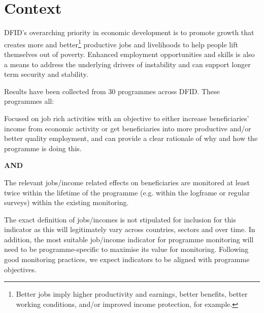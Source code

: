 \section{Context}

DFID's overarching priority in economic development is to promote growth that creates more and better\footnote{Better jobs imply higher productivity and earnings, better benefits, better working conditions, and/or improved income protection, for example.} productive jobs and livelihoods to help people lift themselves out of poverty. %
Enhanced employment opportunities and skills is also a means to address the underlying drivers of instability and can support longer term security and stability. %

Results have been collected from 30 programmes across DFID. %
These programmes all:
\begin{adjustwidth}{0.5cm}{}
Focused on job rich activities with an objective to either increase beneficiaries’ income from economic activity or get beneficiaries into more productive and/or better quality employment, and can provide a clear rationale of why and how the programme is doing this.
\end{adjustwidth}

\begin{adjustwidth}{8cm}{}
\textbf{AND}
\end{adjustwidth}

\begin{adjustwidth}{0.5cm}{}
The relevant jobs/income related effects on beneficiaries are monitored at least twice within the lifetime of the programme (e.g. within the logframe or regular surveys) within the existing monitoring.
\end{adjustwidth}

The exact definition of jobs/incomes is not stipulated for inclusion for this indicator as this will legitimately vary across countries, sectors and over time. %
In addition, the most suitable job/income indicator for programme monitoring will need to be programme-specific to maximise its value for monitoring. %
Following good monitoring practices, we expect indicators to be aligned with programme objectives. %

\newpage
